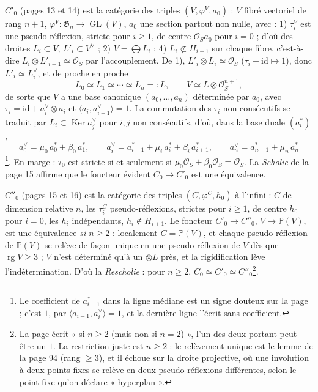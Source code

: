 \documentclass[11pt,a4paper]{article}
\begin{document}
\emph{$C'_0$} (pages 13 et 14) est la catégorie des triples $(V,
\varphi^V, a_0)$ : $V$ fibré vectoriel de rang $n+1$, $\varphi^V \colon
\mathfrak{G}_n \to \operatorname{GL}(V)$, $a_0$ une section partout non nulle,
avec : 1) $\tau_i^V$ est une pseudo-réflexion, stricte pour $i \geqslant 1$,
de centre $\mathcal{O}_S a_0$ pour $i = 0$ ; d'où des droites $L_i \subset V$,
$L'_i \subset V^\vee$ ; 2) $V = \bigoplus L_i$ ; 4) $L_i \not\subset
H_{i+1}$ sur chaque fibre, c'est-à-dire $L_i \otimes L'_{i+1} \simeq
\mathcal{O}_S$ par l'accouplement. De 1), $L'_i \otimes L_i \simeq \mathcal{O}_S$
($\tau_i - \mathrm{id} \mapsto 1$), donc $L'_i \simeq L_i^\vee$, et de proche
en proche
\[
L_0 \simeq L_1 \simeq \cdots \simeq L_n =: L, \qquad V \simeq L \otimes
\mathcal{O}_S^{n+1},
\]
de sorte que $V$ a une base canonique $(a_0, \ldots, a_n)$ déterminée par
$a_0$, avec $\tau_i = \mathrm{id} + a_i^\vee \otimes a_i$ et $\langle a_i,
a_{i+1}^\vee \rangle = 1$. La commutation des $\tau_i$ non consécutifs se
traduit par $L_i \subset \operatorname{Ker} a_j^\vee$ pour $i, j$ non
consécutifs, d'où, dans la base duale $(a_i^*)$,
\[
a_0^\vee = \mu_0\, a_0^* + \beta_0\, a_1^*, \qquad
a_i^\vee = a_{i-1}^* + \mu_i\, a_i^* + \beta_i\, a_{i+1}^*, \qquad
a_n^\vee = a_{n-1}^* + \mu_n\, a_n^*
\]
\footnote{Le coefficient de $a_{i-1}^*$ dans la ligne médiane est un signe
douteux sur la page ; c'est $1$, par $\langle a_{i-1}, a_i^\vee \rangle = 1$, et
la dernière ligne l'écrit sans coefficient.}. En marge : $\tau_0$ est stricte
si et seulement si $\mu_0\mathcal{O}_S + \beta_0\mathcal{O}_S = \mathcal{O}_S$.
La \emph{Scholie} de la page 15 affirme que le foncteur évident $C_0 \to C'_0$
est une équivalence.

\emph{$C''_0$} (pages 15 et 16) est la catégorie des triples $(C, \varphi^C,
h_0)$ à l'infini : $C$ de dimension relative $n$, les $\tau_i^C$
pseudo-réflexions, strictes pour $i \geqslant 1$, de centre $h_0$ pour $i =
0$, les $h_i$ indépendants, $h_i \notin H_{i+1}$. Le foncteur $C'_0 \to C''_0$,
$V \mapsto \mathbb{P}(V)$, est une équivalence \emph{si $n \geqslant 2$} :
localement $C = \mathbb{P}(V)$, et chaque pseudo-réflexion de $\mathbb{P}(V)$ se
relève de façon unique en une pseudo-réflexion de $V$ dès que $\operatorname{rg}
V \geqslant 3$ ; $V$ n'est déterminé qu'à un $\otimes L$ près, et la
rigidification lève l'indétermination. D'où la \emph{Rescholie} : pour $n
\geqslant 2$, $C_0 \simeq C'_0 \simeq C''_0$\footnote{La page écrit « si $n
\geqslant 2$ (mais non si $n = 2$) », l'un des deux portant peut-être un $1$.
La restriction juste est $n \geqslant 2$ : le relèvement unique est le lemme
de la page 94 (rang $\geqslant 3$), et il échoue sur la droite projective, où
une involution à deux points fixes se relève en deux pseudo-réflexions
différentes, selon le point fixe qu'on déclare « hyperplan ».}.
\end{document}
